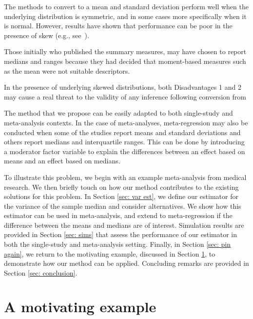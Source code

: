\documentclass{article}
\begin{document}
\begin{disadv}\label{disadv:1}
The methods to convert to a mean and standard deviation perform well when the underlying distribution is symmetric, and in some cases more specifically when it is normal.  However, results have shown that performance can be poor in the presence of skew (e.g., see~\cite{shi2018estimate}).
\end{disadv}

\begin{disadv}\label{disadv:2}
Those initially who published the summary measures, may have chosen to report medians and ranges because they had decided that moment-based measures such as the mean were not suitable descriptors.
\end{disadv}

In the presence of underlying skewed distributions, both Disadvantages 1 and 2 may cause a real threat to the validity of any inference following conversion from


The method that we propose can be easily adapted to both single-study and meta-analysis contexts.  In the case of meta-analyses, meta-regression may also be conducted when some of the studies report means and standard deviations and others report medians and interquartile ranges.  This can be done by introducing a moderator factor variable to explain the differences between an effect based on means and an effect based on medians.

To illustrate this problem, we begin with an example meta-analysis from medical research. We then briefly touch on how our method contributes to the existing solutions for this problem. In Section \ref{sec: var est}, we define our estimator for the variance of the sample median and consider alternatives. We show how this estimator can be used in meta-analysis, and extend to meta-regression if the difference between the means and medians are of interest. Simulation results are provided in Section \ref{sec: sims} that assess the performance of our estimator in both the single-study and meta-analysis setting.   Finally, in Section \ref{sec: pin again}, we return to the motivating example, discussed in Section \ref{sec: motiv}, to demonstrate how our method can be applied. Concluding remarks are provided in Section \ref{sec: conclusion}.

\section{A motivating example}
\label{sec: motiv}
\end{document}
